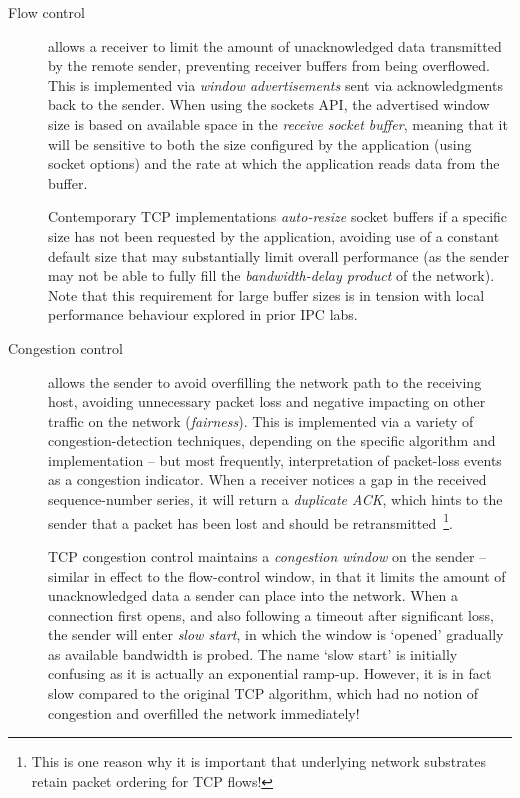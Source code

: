 \documentclass[a4paper,10pt]{article}
\begin{document}
\begin{description}
\item[Flow control] allows a receiver to limit the amount of unacknowledged
  data transmitted by the remote sender, preventing receiver buffers from
  being overflowed.
  This is implemented via \textit{window advertisements} sent via
  acknowledgments back to the sender.
  When using the sockets API, the advertised window size is based on available
  space in the \textit{receive socket buffer}, meaning that it will be
  sensitive to both the size configured by the application (using socket
  options) and the rate at which the application reads data from the buffer.

  Contemporary TCP implementations \textit{auto-resize} socket buffers if a
  specific size has not been requested by the application, avoiding use of a
  constant default size that may substantially limit overall performance (as
  the sender may not be able to fully fill the \textit{bandwidth-delay
  product} of the network).
  Note that this requirement for large buffer sizes is in tension with local
  performance behaviour explored in prior IPC labs.

\item[Congestion control] allows the sender to avoid overfilling the network
  path to the receiving host, avoiding unnecessary packet loss and negative
  impacting on other traffic on the network (\textit{fairness}).
  This is implemented via a variety of congestion-detection techniques,
  depending on the specific algorithm and implementation -- but most
  frequently, interpretation of packet-loss events as a congestion indicator.
  When a receiver notices a gap in the received sequence-number series, it
  will return a \textit{duplicate ACK}, which hints to the sender that a
  packet has been lost and should be retransmitted~\footnote{This is one
  reason why it is important that underlying network substrates retain packet
  ordering for TCP flows!}.

  TCP congestion control maintains a \textit{congestion window} on the sender
  -- similar in effect to the flow-control window, in that it limits the
  amount of unacknowledged data a sender can place into the network.
  When a connection first opens, and also following a timeout after
  significant loss, the sender will enter \textit{slow start}, in which the
  window is `opened' gradually as available bandwidth is probed.
  The name `slow start' is initially confusing as it is actually an
  exponential ramp-up.
  However, it is in fact slow compared to the original TCP algorithm, which
  had no notion of congestion and overfilled the network immediately!


\end{description}
\end{document}

